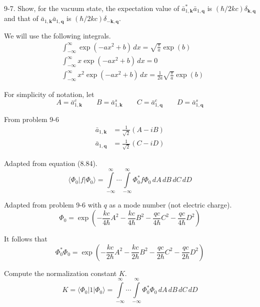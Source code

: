 \documentclass[12pt]{article}
\begin{document}
9-7.
Show, for the vacuum state, the expectation value
of $\bar a_{1,\mathbf k}^*\bar a_{1,\mathbf q}$
is $(\hbar/2kc)\delta_{\mathbf k,\mathbf q}$ and that
of $\bar a_{1,\mathbf k}\bar a_{1,\mathbf q}$
is $(\hbar/2kc)\delta_{-\mathbf k,\mathbf q}$.

\bigskip
We will use the following integrals.
\begin{align*}
&\int_{-\infty}^\infty\exp(-ax^2+b)\,dx=\sqrt{\frac{\pi}{a}}\exp(b)
\tag{1}
\\
&\int_{-\infty}^\infty x\exp(-ax^2+b)\,dx=0
\tag{2}
\\
&\int_{-\infty}^\infty x^2\exp(-ax^2+b)\,dx=\frac{1}{2a}\sqrt{\frac{\pi}{a}}\exp(b)
\tag{3}
\end{align*}

For simplicity of notation, let
\begin{equation*}
A=\bar a_{1,\mathbf k}^c
\qquad
B=\bar a_{1,\mathbf k}^s
\qquad
C=\bar a_{1,\mathbf q}^c
\qquad
D=\bar a_{1,\mathbf q}^s
\end{equation*}

From problem 9-6
\begin{equation*}
\begin{aligned}
\bar a_{1,\mathbf k}&=\frac{1}{\sqrt2}(A-iB)
\\
\bar a_{1,\mathbf q}&=\frac{1}{\sqrt2}(C-iD)
\end{aligned}
\tag{4}
\end{equation*}

Adapted from equation (8.84).
\begin{equation*}
\langle\Phi_0|f|\Phi_0\rangle
=\int\limits_{-\infty}^\infty\cdots\int\limits_{-\infty}^\infty
\Phi_0^*f\Phi_0
\,dA\,dB\,dC\,dD
\end{equation*}

Adapted from problem 9-6 with $q$ as a mode number (not electric charge).
\begin{equation*}
\Phi_0=\exp\left(
-\frac{kc}{4\hbar}A^2
-\frac{kc}{4\hbar}B^2
-\frac{qc}{4\hbar}C^2
-\frac{qc}{4\hbar}D^2
\right)
\end{equation*}

It follows that
\begin{equation*}
\Phi_0^*\Phi_0=\exp\left(
-\frac{kc}{2\hbar}A^2
-\frac{kc}{2\hbar}B^2
-\frac{qc}{2\hbar}C^2
-\frac{qc}{2\hbar}D^2
\right)
\end{equation*}

Compute the normalization constant $K$.
\begin{equation*}
K=\langle\Phi_0|1|\Phi_0\rangle
=\int\limits_{-\infty}^\infty\cdots\int\limits_{-\infty}^\infty
\Phi_0^*\Phi_0
\,dA\,dB\,dC\,dD
\end{equation*}
\end{document}
